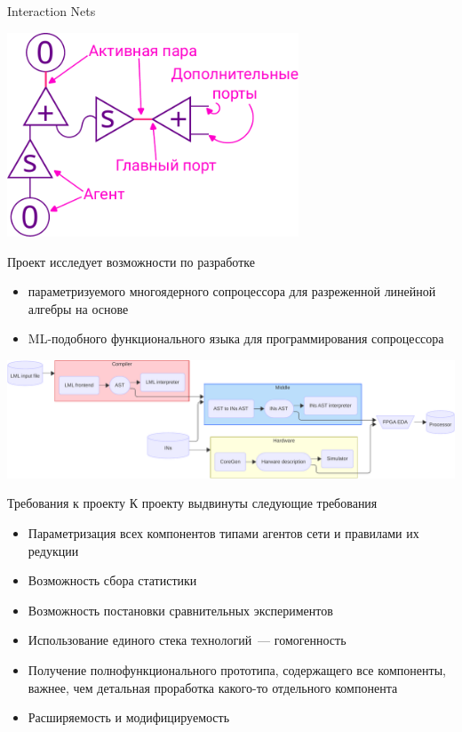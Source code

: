 \documentclass
  [ russian
  , aspectratio=169 %
  ] {beamer}
\begin{document}
\begin{frame}{Interaction Nets}
    \begin{center}
        \includegraphics[width=0.65\textwidth]{figures/in_talk.pdf}
    \end{center}
\end{frame}

\begin{frame}{\Lamagraph{}}
    Проект \Lamagraph{} исследует возможности по разработке
    \begin{itemize}
        \item параметризуемого многоядерного сопроцессора для разреженной линейной алгебры на основе \INs{}
        \item ML-подобного функционального языка для программирования сопроцессора
    \end{itemize}
    \begin{center}
        \includegraphics[width=\linewidth]{figures/lamagraph-big-horiz.pdf}
    \end{center}
\end{frame}

\begin{frame}{Требования к проекту}
    К проекту выдвинуты следующие требования
    \begin{itemize}
        \item Параметризация всех компонентов типами агентов сети и правилами их редукции
        \item Возможность сбора статистики
        \item Возможность постановки сравнительных экспериментов
        \item Использование единого стека технологий~--- гомогенность
        \item Получение полнофункционального прототипа, содержащего все компоненты, важнее, чем детальная проработка какого-то отдельного компонента
        \item Расширяемость и модифицируемость
    \end{itemize}
\end{frame}
\end{document}
